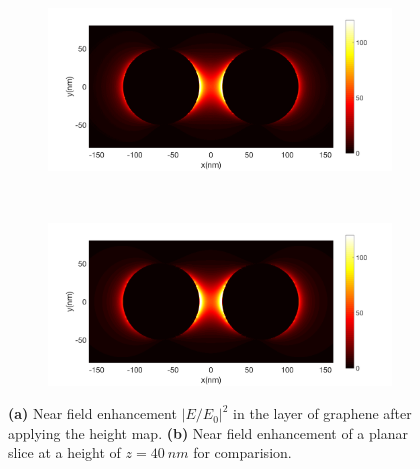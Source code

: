 \begin{figure}[!h]
  \centering
  \begin{subfigure}[t]{0.48\textwidth}
    \caption{}
    \includegraphics[width=\textwidth]{./images/graphene-layer.png}
  \end{subfigure}
  ~
  \begin{subfigure}[t]{0.48\textwidth}
    \caption{}
    \includegraphics[width=\textwidth]{./images/40nm-2nm.png}
  \end{subfigure}
  \caption{\textbf{(a)} Near field enhancement $|E/E_0|^2$ in the layer of graphene after applying the height map. \textbf{(b)} Near field enhancement of a planar slice at a height of $z=\SI{40}{nm}$ for comparision.}
  \label{fig:projected}
\end{figure}
